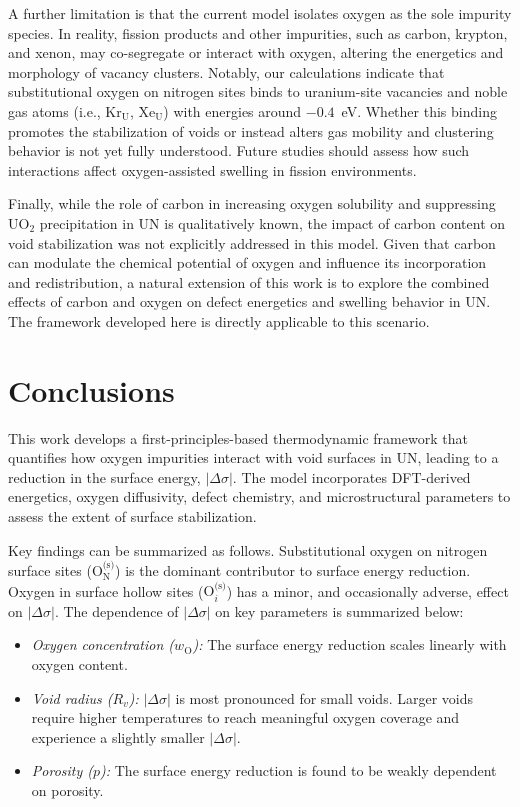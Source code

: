 \documentclass[preprint,12pt,sort&compress]{elsarticle}
\newcommand{\?}{\stackrel{?}{=}}
\begin{document}
A further limitation is that the current model isolates oxygen as the sole impurity species. In reality, fission products and other impurities, such as carbon, krypton, and xenon, may co-segregate or interact with oxygen, altering the energetics and morphology of vacancy clusters. Notably, our calculations indicate that substitutional oxygen on nitrogen sites binds to uranium-site vacancies and noble gas atoms (i.e., Kr$_\text{U}$, Xe$_\text{U}$) with energies around $-0.4$~eV. Whether this binding promotes the stabilization of voids or instead alters gas mobility and clustering behavior is not yet fully understood. Future studies should assess how such interactions affect oxygen-assisted swelling in fission environments.

Finally, while the role of carbon in increasing oxygen solubility and suppressing UO$_2$ precipitation in UN is qualitatively known, the impact of carbon content on void stabilization was not explicitly addressed in this model. Given that carbon can modulate the chemical potential of oxygen and influence its incorporation and redistribution, a natural extension of this work is to explore the combined effects of carbon and oxygen on defect energetics and swelling behavior in UN. The framework developed here is directly applicable to this scenario.

\section{Conclusions}

This work develops a first-principles-based thermodynamic framework that quantifies how oxygen impurities interact with void surfaces in UN, leading to a reduction in the surface energy, $|\Delta \sigma|$. The model incorporates DFT-derived energetics, oxygen diffusivity, defect chemistry, and microstructural parameters to assess the extent of surface stabilization.

Key findings can be summarized as follows. Substitutional oxygen on nitrogen surface sites ($\text{O}_\text{N}^\text{(s)}$) is the dominant contributor to surface energy reduction. Oxygen in surface hollow sites ($\text{O}_i^\text{(s)}$) has a minor, and occasionally adverse, effect on $|\Delta \sigma|$. The dependence of $|\Delta \sigma|$ on key parameters is summarized below:
\begin{itemize}
    \item \textit{Oxygen concentration ($w_\text{O}$):} The surface energy reduction scales linearly with oxygen content.
    \item \textit{Void radius ($R_v$):} $|\Delta \sigma|$ is most pronounced for small voids. Larger voids require higher temperatures to reach meaningful oxygen coverage and experience a slightly smaller $|\Delta \sigma|$.
    \item \textit{Porosity ($p$):} The surface energy reduction is found to be weakly dependent on porosity.
    \end{itemize}
\end{document}
